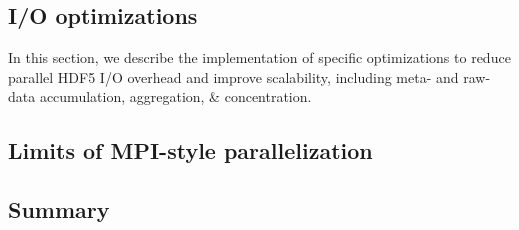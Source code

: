 \subsection{I/O optimizations}

In this section, we describe the implementation of specific optimizations to reduce parallel HDF5 I/O overhead and improve scalability, including meta- and raw-data accumulation, aggregation, \& concentration.

\subsection{Limits of MPI-style parallelization}


\subsection{Summary}